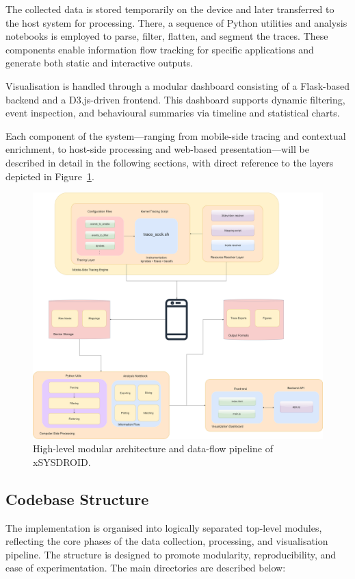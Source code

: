 \documentclass[a4paper,12pt]{report}
\begin{document}
The collected data is stored temporarily on the device and later transferred to the host system for processing. There, a sequence of Python utilities and analysis notebooks is employed to parse, filter, flatten, and segment the traces. These components enable information flow tracking for specific applications and generate both static and interactive outputs.

Visualisation is handled through a modular dashboard consisting of a Flask-based backend and a D3.js-driven frontend. This dashboard supports dynamic filtering, event inspection, and behavioural summaries via timeline and statistical charts.

Each component of the system—ranging from mobile-side tracing and contextual enrichment, to host-side processing and web-based presentation—will be described in detail in the following sections, with direct reference to the layers depicted in Figure~\ref{fig:architecture}.
\begin{figure}[H]
\centering
\includegraphics[width=1\textwidth]{architecture.png}
\caption{High-level modular architecture and data-flow pipeline of xSYSDROID.}
\label{fig:architecture}
\end{figure}



\subsection{Codebase Structure}

The implementation is organised into logically separated top-level modules, reflecting the core phases of the data collection, processing, and visualisation pipeline. The structure is designed to promote modularity, reproducibility, and ease of experimentation. The main directories are described below:
\end{document}
